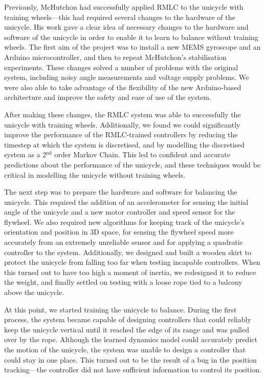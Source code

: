 \documentclass{IIBproject}
\begin{document}
Previously, McHutchon had successfully applied RMLC to the unicycle with
training wheels---this had required several changes to the hardware of the
unicycle. His work gave a clear idea of necessary changes to the hardware and
software of the unicycle in order to enable it to learn to balance without
training wheels. The first aim of the project was to install a new MEMS
gyroscope and an Arduino microcontroller, and then to repeat McHutchon's
stabilisation experiments. These changes solved a number of problems with the
original system, including noisy angle measurements and voltage supply
problems. We were also able to take advantage of the flexibility of the new
Arduino-based architecture and improve the safety and ease of use of the
system.

After making these changes, the RMLC system was able to successfully the
unicycle with training wheels. Additionally, we found we could significantly
improve the performance of the RMLC-trained controllers by reducing the
timestep at which the system is discretised, and by modelling the discretised
system as a 2$^\textrm{nd}$ order Markov Chain. This led to confident and
accurate predictions about the performance of the unicycle, and these
techniques would be critical in modelling the unicycle without training
wheels.

The next step was to prepare the hardware and software for balancing the
unicycle. This required the addition of an accelerometer for sensing the
initial angle of the unicycle and a new motor controller and speed sensor for
the flywheel. We also required new algorithms for keeping track of the
unicycle's orientation and position in 3D space, for sensing the flywheel
speed more accurately from an extremely unreliable sensor and for applying a
quadratic controller to the system. Additionally, we designed and built a
wooden skirt to protect the unicycle from falling too far when testing
incapable controllers. When this turned out to have too high a moment of
inertia, we redesigned it to reduce the weight, and finally settled on testing
with a loose rope tied to a balcony above the unicycle.

At this point, we started training the unicycle to balance. During the first
process, the system became capable of designing controllers that could
reliably keep the unicycle vertical until it reached the edge of its range and
was pulled over by the rope. Although the learned dynamics model could
accurately predict the motion of the unicycle, the system was unable to design
a controller that could stay in one place. This turned out to be the result of
a bug in the position tracking---the controller did not have sufficient
information to control its position.
\end{document}
